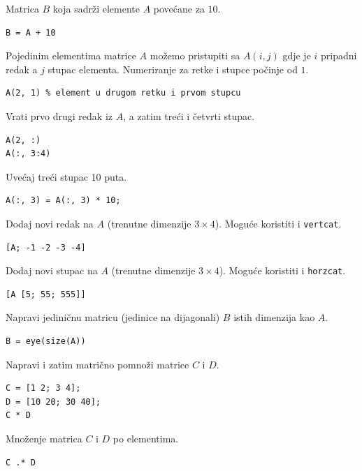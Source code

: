 \documentclass[a4paper, 10pt]{article}
\begin{document}
Matrica $B$ koja sadrži elemente $A$ povećane za $10$.

\begin{lstlisting}
B = A + 10
\end{lstlisting}

Pojedinim elementima matrice $A$ možemo pristupiti sa $A(i, j)$ gdje je $i$ pripadni redak a $j$ stupac elementa. Numeriranje za retke i stupce počinje od $1$.

\begin{lstlisting}
A(2, 1) % element u drugom retku i prvom stupcu
\end{lstlisting}

Vrati prvo drugi redak iz $A$, a zatim treći i četvrti stupac.

\begin{lstlisting}
A(2, :)
A(:, 3:4)
\end{lstlisting}

Uvećaj treći stupac 10 puta.

\begin{lstlisting}
A(:, 3) = A(:, 3) * 10;
\end{lstlisting}

Dodaj novi redak na $A$ (trenutne dimenzije $3 \times 4$). Moguće koristiti i \texttt{vertcat}.

\begin{lstlisting}
[A; -1 -2 -3 -4]
\end{lstlisting}

Dodaj novi stupac na $A$ (trenutne dimenzije $3 \times 4$). Moguće koristiti i \texttt{horzcat}.

\begin{lstlisting}
[A [5; 55; 555]]
\end{lstlisting}

Napravi jediničnu matricu (jedinice na dijagonali) $B$ istih dimenzija kao $A$.

\begin{lstlisting}
B = eye(size(A))
\end{lstlisting}

Napravi i zatim matrično pomnoži matrice $C$ i $D$.

\begin{lstlisting}
C = [1 2; 3 4];
D = [10 20; 30 40];
C * D
\end{lstlisting}

Množenje matrica $C$ i $D$ po elementima.

\begin{lstlisting}
C .* D
\end{lstlisting}
\end{document}
